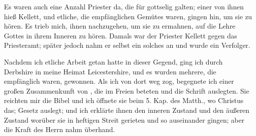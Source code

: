 Es waren auch eine Anzahl Priester da, die für gottselig
galten; einer von ihnen hieß Kellett, und etliche, die empfänglichen
Gemütes waren, gingen hin, um sie zu hören. Es trieb mich,
ihnen nachzugehen, um sie zu ermahnen, auf die Lehre Gottes in
ihrem Inneren zu hören. Damals war der Priester Kellett gegen
das Priesteramt; später jedoch nahm er selbst ein solches an und
wurde ein Verfolger.

Nachdem ich etliche Arbeit getan hatte in dieser Gegend,
ging ich durch Derbshire in meine 
Heimat Leicestershire, und
es wurden mehrere, die empfänglich waren, gewonnen. Als ich
von dort weg zog, begegnete ich einer großen Zusammenkunft
von , die im Freien beteten und die Schrift 
auslegten. Sie reichten mir die Bibel und ich öffnete sie beim 5. Kap.
des Matth., wo Christus das; 
Gesetz auslegt; und ich erklärte
ihnen den inneren Zustand und den äußeren Zustand worüber sie
in heftigen Streit gerieten und so auseinander gingen; aber die
Kraft des Herrn  nahm überhand.

